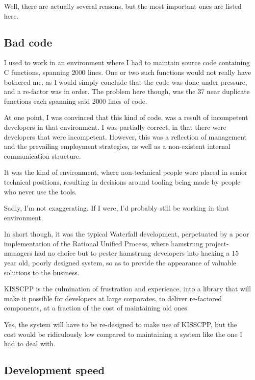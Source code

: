Well, there are actually several reasons, but the most important ones are listed here.

\subsection*{Bad code}

I used to work in an environment where I had to maintain source code containing C functions, spanning 2000 lines. One or two such functions would not really have bothered me, as I would simply conclude that the code was done under pressure, and a re-\/factor was in order. The problem here though, was the 37 near duplicate functions each spanning said 2000 lines of code.

At one point, I was convinced that this kind of code, was a result of incompetent developers in that environment. I was partially correct, in that there were developers that were incompetent. However, this was a reflection of management and the prevailing employment strategies, as well as a non-\/existent internal communication structure.

It was the kind of environment, where non-\/technical people were placed in senior technical positions, resulting in decisions around tooling being made by people who never use the tools.

Sadly, I'm not exaggerating. If I were, I'd probably still be working in that environment.

In short though, it was the typical Waterfall development, perpetuated by a poor implementation of the Rational Unified Process, where hamstrung project-\/managers had no choice but to pester hamstrung developers into hacking a 15 year old, poorly designed system, so as to provide the appearance of valuable solutions to the business.

K\-I\-S\-S\-C\-P\-P is the culmination of frustration and experience, into a library that will make it possible for developers at large corporates, to deliver re-\/factored components, at a fraction of the cost of maintaining old ones.

Yes, the system will have to be re-\/designed to make use of K\-I\-S\-S\-C\-P\-P, but the cost would be ridiculously low compared to maintaining a system like the one I had to deal with.

\subsection*{Development speed}

